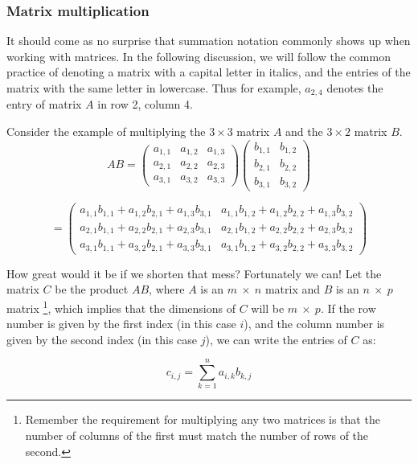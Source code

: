 \subsubsection*{Matrix multiplication}
It should come as no surprise that summation notation commonly shows up when working with matrices. In the following discussion, we will follow the common practice of denoting a matrix with a capital letter in italics, and the entries of the matrix with the same letter in lowercase. Thus for example, $a_{2,4}$ denotes the entry of matrix $A$ in row 2, column 4.
   
 Consider the example of multiplying the $3 \times 3$ matrix $A$ and the $3 \times 2$ matrix $B$. 
\[{A}{B} = \left( \begin{array}{ccc}
a_{1,1} & a_{1,2}  & a_{1,3}  \\
a_{2,1} & a_{2,2} & a_{2,3} \\
a_{3,1} & a_{3,2} & a_{3,3} \end{array} \right)
 \left( \begin{array}{cc}
b_{1,1} & b_{1,2}    \\
b_{2,1} & b_{2,2}  \\
b_{3,1} & b_{3,2}  \end{array} \right) \]

\[= \left( \begin{array}{cc}
a_{1,1} b_{1,1} + a_{1,2} b_{2,1} + a_{1,3} b_{3,1} & a_{1,1} b_{1,2} + a_{1,2} b_{2,2} + a_{1,3} b_{3,2}  \\
a_{2,1} b_{1,1} + a_{2,2} b_{2,1} + a_{2,3} b_{3,1} & a_{2,1} b_{1,2} + a_{2,2} b_{2,2} + a_{2,3} b_{3,2}  \\
a_{3,1} b_{1,1} + a_{3,2} b_{2,1} + a_{3,3} b_{3,1} & a_{3,1} b_{1,2} + a_{3,2} b_{2,2} + a_{3,3} b_{3,2}  \end{array} \right) \]

How great would it be if we shorten that mess?  Fortunately we can!  Let the matrix ${C}$ be the product ${A} {B}$, where ${A}$ is an $m ~\times ~n$ matrix  and ${B}$ is an $n ~\times ~p$ matrix \footnote{Remember the requirement for multiplying any two matrices is that the number of columns of the first must match the number of rows of the second.}, which implies that the dimensions of ${C}$ will be $m ~ \times ~ p$.  If the row number is given by the first index (in this case $i$), and the column number is given by the second index (in this case $j$), we can write the entries of  ${C}$ as: 

\[ {c}_{i,j}= \sum_{k=1}^n a_{i,k} b_{k,j} \]

